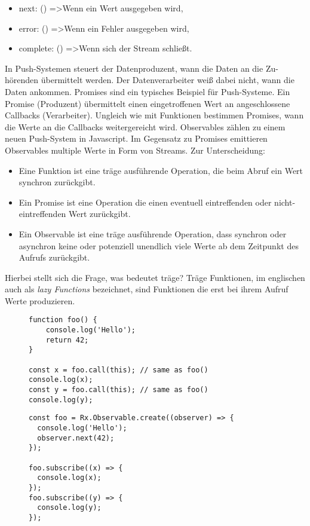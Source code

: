 \begin{itemize}
\item next: () =\textgreater Wenn ein Wert ausgegeben wird,
\item error: () =\textgreater Wenn ein Fehler ausgegeben wird,
\item complete: () =\textgreater Wenn sich der Stream schließt.
\end{itemize}

\noindent
In Push-Systemen steuert der Datenproduzent, wann die Daten an die Zu-hörenden übermittelt werden. Der Datenverarbeiter weiß dabei nicht, wann die Daten ankommen. Promises sind ein typisches Beispiel für Push-Systeme. Ein Promise (Produzent) übermittelt einen eingetroffenen Wert an angeschlossene Callbacks (Verarbeiter). Ungleich wie mit Funktionen bestimmen Promises, wann die Werte an die Callbacks weitergereicht wird. Observables zählen zu einem neuen Push-System in Javascript. Im Gegensatz zu Promises emittieren Observables multiple Werte in Form von Streams. Zur Unterscheidung:

\begin{itemize}
\item Eine Funktion ist eine träge ausführende Operation, die beim Abruf ein Wert synchron zurückgibt.
\item Ein Promise ist eine Operation die einen eventuell eintreffenden oder nicht-eintreffenden Wert zurückgibt.
\item Ein Observable ist eine träge ausführende Operation, dass synchron oder asynchron keine oder potenziell unendlich viele Werte ab dem Zeitpunkt des Aufrufs zurückgibt.
\end{itemize}

\noindent
Hierbei stellt sich die Frage, was bedeutet träge? Träge Funktionen, im englischen auch als \textit{lazy Functions} bezeichnet, sind Funktionen die erst bei ihrem Aufruf Werte produzieren.\cite{lazy-functions}

\begin{figure}[H]
\begin{lstlisting}[basicstyle=\small]
function foo() {
    console.log('Hello');
    return 42;
}

const x = foo.call(this); // same as foo()
console.log(x);
const y = foo.call(this); // same as foo()
console.log(y);
\end{lstlisting}
\end{figure}

\begin{figure}[H]
\begin{lstlisting}[basicstyle=\small]
const foo = Rx.Observable.create((observer) => {
  console.log('Hello');
  observer.next(42);
});

foo.subscribe((x) => {
  console.log(x);
});
foo.subscribe((y) => {
  console.log(y);
});
\end{lstlisting}
\end{figure}

